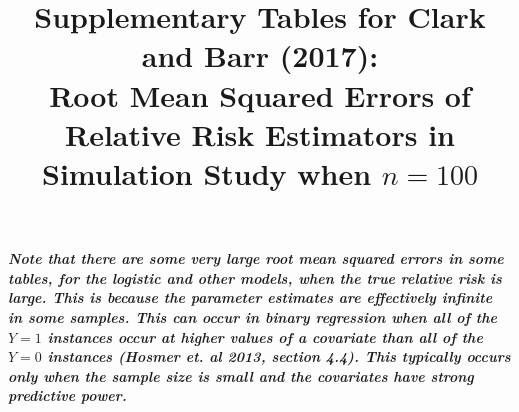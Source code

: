 \documentclass[12pt,a4paper]{article}
\date{}
\begin{document}
\title{Supplementary Tables for Clark and Barr (2017):  \\  
Root Mean Squared Errors of Relative Risk Estimators in Simulation Study when $n=100$ }


\maketitle



{\bf \it Note that there are some very large root mean squared errors in some tables, for the logistic and other models, when the true relative risk is large. This is because the parameter estimates are effectively infinite in some samples. This can occur in binary regression when all of the $Y=1$ instances occur at higher values of a covariate than all of the $Y=0$ instances (Hosmer et. al 2013, section 4.4). This typically occurs only when the sample size is small and the covariates have strong predictive power.}
\end{document}
